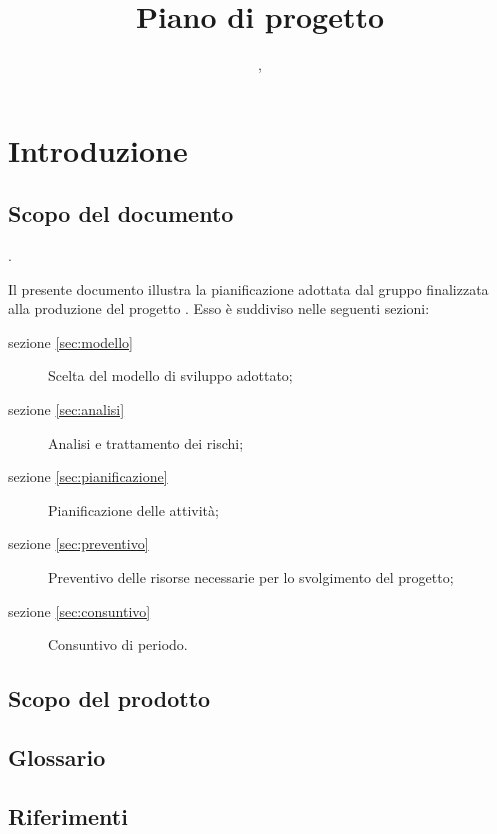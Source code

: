 

\author{\LB, \PB}
\supervisor{\GG, \MM}
\dest{\TV, \ZU}
\title{Piano di progetto}


\maketitle

\tableofcontents
\newpage

\section{Introduzione}
	\subsection{Scopo del documento}.

	Il presente documento illustra la pianificazione adottata dal gruppo \hx{} finalizzata alla produzione del progetto \proj{}. Esso è suddiviso nelle seguenti sezioni:
\begin{description}
	\item[sezione \ref{sec:modello}] Scelta del modello di sviluppo adottato;
	\item[sezione \ref{sec:analisi}] Analisi e trattamento dei rischi;
	\item[sezione \ref{sec:pianificazione}] Pianificazione delle attività;
	\item[sezione \ref{sec:preventivo}] Preventivo delle risorse necessarie per lo svolgimento del progetto;
           \item[sezione \ref{sec:consuntivo}] Consuntivo di periodo.
\end{description}

	\subsection{Scopo del prodotto}
	\scopo{}
	
	\subsection{Glossario}
	\presgloss{}
	\subsection{Riferimenti}
